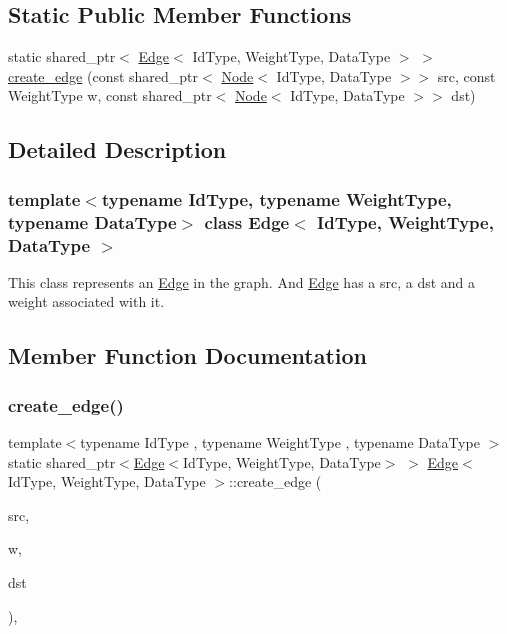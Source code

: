\subsection*{Static Public Member Functions}
\begin{DoxyCompactItemize}
\item 
static shared\+\_\+ptr$<$ \hyperlink{class_edge}{Edge}$<$ Id\+Type, Weight\+Type, Data\+Type $>$ $>$ \hyperlink{class_edge_a6a3a07975dba67016f5ef615a88434f1}{create\+\_\+edge} (const shared\+\_\+ptr$<$ \hyperlink{class_node}{Node}$<$ Id\+Type, Data\+Type $>$$>$ src, const Weight\+Type w, const shared\+\_\+ptr$<$ \hyperlink{class_node}{Node}$<$ Id\+Type, Data\+Type $>$$>$ dst)
\end{DoxyCompactItemize}


\subsection{Detailed Description}
\subsubsection*{template$<$typename Id\+Type, typename Weight\+Type, typename Data\+Type$>$\newline
class Edge$<$ Id\+Type, Weight\+Type, Data\+Type $>$}

This class represents an \hyperlink{class_edge}{Edge} in the graph. And \hyperlink{class_edge}{Edge} has a src, a dst and a weight associated with it. 

\subsection{Member Function Documentation}
\mbox{\label{class_edge_a6a3a07975dba67016f5ef615a88434f1}} 
\subsubsection{\texorpdfstring{create\+\_\+edge()}{create\_edge()}}
{\footnotesize\ttfamily template$<$typename Id\+Type , typename Weight\+Type , typename Data\+Type $>$ \\
static shared\+\_\+ptr$<$\hyperlink{class_edge}{Edge}$<$Id\+Type, Weight\+Type, Data\+Type$>$ $>$ \hyperlink{class_edge}{Edge}$<$ Id\+Type, Weight\+Type, Data\+Type $>$\+::create\+\_\+edge (\begin{DoxyParamCaption}\item[{const shared\+\_\+ptr$<$ \hyperlink{class_node}{Node}$<$ Id\+Type, Data\+Type $>$$>$}]{src,  }\item[{const Weight\+Type}]{w,  }\item[{const shared\+\_\+ptr$<$ \hyperlink{class_node}{Node}$<$ Id\+Type, Data\+Type $>$$>$}]{dst }\end{DoxyParamCaption})\hspace{0.3cm}{\ttfamily [inline]}, {\ttfamily [static]}}

